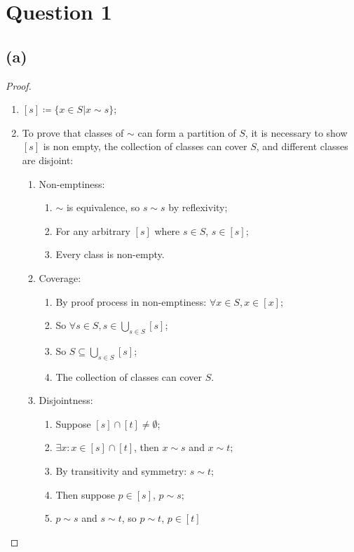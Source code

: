 \documentclass{article}
\begin{document}
\section*{Question 1}

\subsection*{(a)}

\begin{proof}
~
    \begin{enumerate}
    \item $[s]\coloneqq \{x\in S |x\sim s\}$;
    \item To prove that classes of $\sim$ can form a partition of $S$, it is necessary to show $[s]$ is non empty, the collection of classes can cover $S$, and different classes are disjoint:
    \begin{enumerate}
        \item Non-emptiness: \begin{enumerate}
            \item $\sim$ is equivalence, so $s\sim s$ by reflexivity;
            \item For any arbitrary $[s]$ where $s\in S$, $s\in[s]$;
            \item Every class is non-empty.
        \end{enumerate}
        \item Coverage: \begin{enumerate}
            \item By proof process in non-emptiness: $\forall x\in S, x\in [x]$;
            \item So $\forall s\in S,s\in \bigcup_{s\in S}[s]$;
            \item So $S \subseteq \bigcup_{s\in S}[s]$;
            \item The collection of classes can cover $S$.
        \end{enumerate}
        \item  Disjointness: \begin{enumerate}
            \item Suppose $[s]\cap[t]\ne \emptyset$;
            \item $\exists x: x\in [s]\cap [t]$, then $x\sim s$ and $x\sim t$;
            \item By transitivity and symmetry: $s\sim t$;
            \item Then suppose $p\in [s]$, $p\sim s$;
            \item $p\sim s$ and $s\sim t $, so $p\sim t$, $p\in[t]$

\end{enumerate}
\end{enumerate}
\end{enumerate}
\end{proof}
\end{document}
